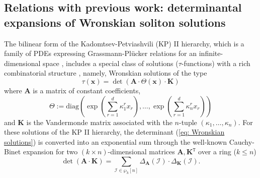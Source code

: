 \documentclass[10pt]{article}
\theoremstyle{remark}%
\theoremstyle{definition}%
\begin{document}
\subsection{Relations with previous work: determinantal expansions of Wronskian soliton solutions}
\label{subsec: determinantal expansions and soliton solutions}
%
The bilinear form of the Kadomtsev-Petviashvili (KP) II hierarchy, which is a family of PDEs expressing Grassmann-Pl\"{u}cker relations for an infinite-dimensional space \citep{Harnad2020},  
includes a special class of solutions ($\tau$-functions) with a rich combinatorial structure \citep{Kodama2017}, namely, Wronskian solutions of the type  
 \begin{equation}
\tau(\mathbf{x})=\det(\mathbf{A}\cdot{\ensuremath{\Theta}}(\mathbf{x})\cdot\mathbf{K})
\label{eq: Wronskian solutions}
 \end{equation}
where $\mathbf{A}$ is a matrix of constant coefficients, 
 \begin{equation}
\Theta:=\mathrm{diag}\left(\exp\left(\sum_{r=1}^{d}\kappa_{1}^{r}x_{r}\right),\dots,\exp\left(\sum_{r=1}^{d}\kappa_{n}^{r}x_{r}\right)\right)
\label{eq: diagonal matrix of exponents}
 \end{equation}
and $\mathbf{K}$ is the Vandermonde matrix associated with the $n$-tuple $(\kappa_{1},\dots,\kappa_{n})$. For these solutions of the KP II hierarchy, the determinant (\ref{eq: Wronskian solutions}) is converted into an exponential sum through the well-known Cauchy-Binet expansion for two $(k\times n)$-dimensional matrices $\mathbf{A},\mathbf{K}^{\mathtt{T}}$ over a ring ($k\leq n$) 
 \begin{equation}
\det(\mathbf{A}\cdot\mathbf{K})=\sum_{\mathcal{I}\in \wp_{k}[n]}\Delta_{\mathbf{A}}(\mathcal{I})\cdot\Delta_{\mathbf{K}}(\mathcal{I}).
\label{eq: Cauchy-Binet expansion}
 \end{equation} 
\end{document}
